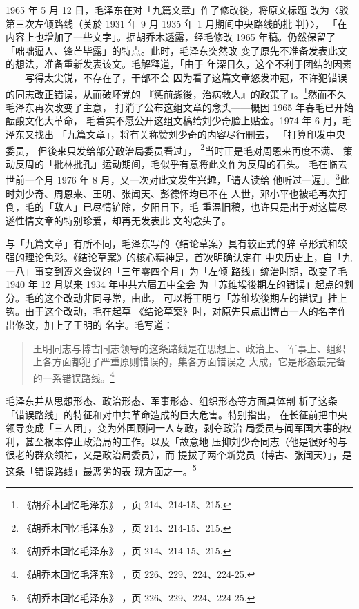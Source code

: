1965 年 5 月 12 日，毛泽东在对「九篇文章」作了修改後，将原文标题
改为〈驳第三次左倾路线（关於 1931 年 9 月 1935 年 1 月期间中央路线的批
判）〉，
「在内容上也增加了一些文字」。据胡乔木透露，经毛修改 1965
年稿。仍然保留了「咄咄逼人、锋芒毕露」的特点。此时，毛泽东突然改
变了原先不准备发表此文的想法，准备重新发表该文。毛解释道，「由于
年深日久，这个不利于团结的因素——写得太尖锐，不存在了，干部不会
因为看了这篇文章怒发冲冠，不许犯错误的同志改正错误，从而破坏党的
『惩前毖後，治病救人』的政策了」。\footnote{《胡乔木回忆毛泽东》
，页 214、214-15、215.}然而不久毛泽东再次改变了主意，
打消了公布这组文章的念头——概因 1965 年春毛已开始酝酿文化大革命，
毛着实不愿公开这组文稿给刘少奇脸上贴金。1974 年 6 月，毛泽东又找出
「九篇文章」，将有关称赞刘少奇的内容尽行删去，
「打算印发中央委员，
但後来只发给部分政治局委员看过」， \footnote{《胡乔木回忆毛泽东》
，页 214、214-15、215.}当时正是毛对周恩来再度不满、
策动反周的「批林批孔」运动期间，毛似乎有意将此文作为反周的石头。
毛在临去世前一个月 1976 年 8 月，又一次对此文发生兴趣，「请人读给
他听过一遍」。\footnote{《胡乔木回忆毛泽东》
，页 214、214-15、215.}此时刘少奇、周恩来、王明、张闻天、彭德怀均已不在
人世，邓小平也被毛再次打倒，毛的「敌人」已尽情铲除，夕阳日下，毛
重温旧稿，也许只是出于对这篇尽遂性情文章的特别珍爱，却再无发表此
文的念头了。

与「九篇文章」有所不同，毛泽东写的〈结论草案〉具有较正式的辞
章形式和较强的理论色彩。《结论草案》的核心精神是，首次明确认定在
中央历史上，自「九一八」事变到遵义会议的「三年零四个月」为「左倾
路线」统治时期，改变了毛 1940 年 12 月以来 1934 年中共六届五中全会
为「苏维埃後期左的错误」起点的划分。毛的这个改动非同寻常，由此，
可以将王明与「苏维埃後期左的错误」挂上钩。由于这个改动，毛在起草
《结论草案》时，对原先只点出博古一人的名字作出修改，加上了王明的
名字。毛写道：
\begin{quote}
{\fzwkai 王明同志与博古同志领导的这条路线是在思想上、政治上、
军事上、组织上各方面都犯了严重原则错误的，集各方面错误之
大成，它是形态最完备的一系错误路线。\footnote{《胡乔木回忆毛泽东》
，页 226、229、224、224-25.}}
\end{quote}
毛泽东并从思想形态、政治形态、军事形态、组织形态等方面具体剖
析了这条「错误路线」的特征和对中共革命造成的巨大危害。特别指出，
在长征前把中央领导变成「三人团」，变为外国顾问一人专政，剥夺政治
局委员与闻军国大事的权利，甚至根本停止政治局的工作。以及「故意地
压抑刘少奇同志（他是很好的与很老的群众领袖，又是政治局委员），而
提拔了两个新党员（博古、张闻天）」，是这条「错误路线」最恶劣的表
现方面之一。\footnote{《胡乔木回忆毛泽东》
，页 226、229、224、224-25.} 

